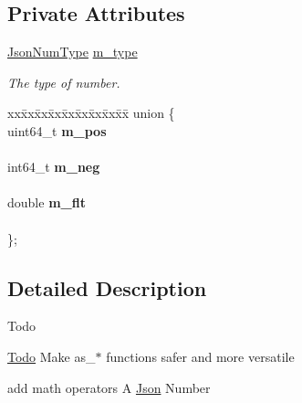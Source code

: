 \subsection*{Private Attributes}
\begin{DoxyCompactItemize}
\item 
\mbox{\label{classnta_1_1utils_1_1JsonNum_abd54e505bcd33dc45877c4b4bb92fa4e}} 
\hyperlink{namespacenta_1_1utils_a83ee7c4cfccd9fa43564f5fe1c0c77d3}{Json\+Num\+Type} \hyperlink{classnta_1_1utils_1_1JsonNum_abd54e505bcd33dc45877c4b4bb92fa4e}{m\+\_\+type}
\begin{DoxyCompactList}\small\item\em The type of number. \end{DoxyCompactList}\item 
\mbox{\label{classnta_1_1utils_1_1JsonNum_a8f60aff135bd41d1680ecdaa738a4a02}} 
\begin{tabbing}
xx\=xx\=xx\=xx\=xx\=xx\=xx\=xx\=xx\=\kill
union \{\\
\mbox{\label{classnta_1_1utils_1_1JsonNum_a266052a158fca895978bb7d9ec43f6ff}} 
uint64\_t {\bfseries m\_pos}\\
\>\\
\mbox{\label{classnta_1_1utils_1_1JsonNum_af488d5d931bc8979df8671070365ac2b}} 
int64\_t {\bfseries m\_neg}\\
\>\\
\mbox{\label{classnta_1_1utils_1_1JsonNum_a01cf51bb14293115a5b3f140ade23d4d}} 
double {\bfseries m\_flt}\\
\>\\
\}; \\

\end{tabbing}\end{DoxyCompactItemize}


\subsection{Detailed Description}
\begin{DoxyRefDesc}{Todo}
\item[\hyperlink{todo__todo000005}{Todo}]Make as\+\_\+$\ast$ functions safer and more versatile 

add math operators A \hyperlink{classnta_1_1utils_1_1Json}{Json} Number \end{DoxyRefDesc}


